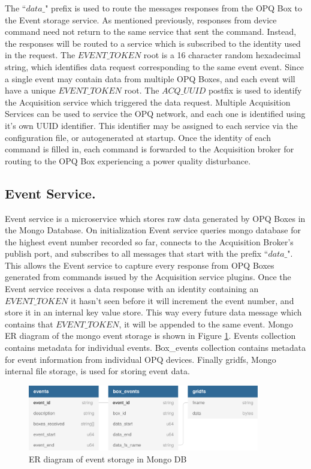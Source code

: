 The ``$data\_$" prefix is used to route the messages responses from the OPQ Box to the Event storage service.
As mentioned previously, responses from device command need not return to the same service that sent the command.
Instead, the responses will be routed to a service which is subscribed to the identity used in the request.
The $EVENT\_TOKEN$ root is a 16 character random hexadecimal string, which identifies data request corresponding to the same event event.
Since a single event may contain data from multiple OPQ Boxes, and each event will have a unique $EVENT\_TOKEN$ root.
The $ACQ\_UUID$ postfix is used to identify the Acquisition service which triggered the data request.
Multiple Acquisition Services can be used to service the OPQ network, and each one is identified using it's own UUID identifier.
This identifier may be assigned to each service via the configuration file, or autogenerated at startup.
Once the identity of each command is filled in, each command is forwarded to the Acquisition broker for routing to the OPQ Box experiencing a power quality disturbance.

\subsection{Event Service.}\label{subsec:event-service}

Event service is a microservice which stores raw data generated by OPQ Boxes in the Mongo Database.
On initialization Event service queries mongo database for the highest event number recorded so far, connects to the Acquisition Broker's publish port,
and subscribes to all messages that start with the prefix ``$data\_$".
This allows the Event service to capture every response from OPQ Boxes generated from commands issued by the Acquisition service plugins.
Once the Event service receives a data response with an identity containing an $EVENT\_TOKEN$ it hasn't seen before it will increment the event number, and
store it in an internal key value store.
This way every future data message which contains that $EVENT\_TOKEN$, it will be appended to the same event.
Mongo ER diagram of the mongo event storage is shown in Figure \ref{fig:opq:mongo_er}.
Events collection contains metadata for individual events.
Box\_events collection contains metadata for event information from individual OPQ devices.
Finally gridfs, Mongo internal file storage, is used for storing event data.

\begin{figure}[h]
	\begin{center}
		\includegraphics[width=0.9\textwidth]{img/mongo_event_storage.pdf}
	\end{center}
	\caption{ER diagram of event storage in Mongo DB}
	\label{fig:opq:mongo_er}
\end{figure}


